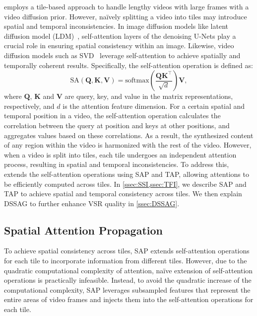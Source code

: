 \ours{} employs a tile-based approach to handle lengthy videos with large frames with a video diffusion prior.
However, na\"ively splitting a video into tiles may introduce spatial and temporal inconsistencies.
In image diffusion models like latent diffusion model (LDM)~\cite{ldm}, self-attention layers of the denoising U-Nets play a crucial role in ensuring spatial consistency within an image.
Likewise, video diffusion models such as SVD~\cite{svd} leverage self-attention to achieve spatially and temporally coherent results.
Specifically, the self-attention operation is defined as:
\begin{equation}
    \text{SA}(\bm{Q},\bm{K},\bm{V}) = \text{softmax} \left( \frac{\bm{QK}^\top}{\sqrt{d}} \right) \bm{V},
    \label{eq:self_attention}
\end{equation}
where $\bm{Q}$, $\bm{K}$ and $\bm{V}$ are query, key, and value in the matrix representations, respectively, and $d$ is the attention feature dimension.
For a certain spatial and temporal position in a video, the self-attention operation calculates the correlation between the query at position and keys at other positions, and aggregates values based on these correlations. As a result, the synthesized content of any region within the video is harmonized with the rest of the video.
However, when a video is split into tiles, each tile undergoes an independent attention process, resulting in spatial and temporal inconsistencies. To address this, \ours{} extends the self-attention operations using SAP and TAP, allowing attentions to be efficiently computed across tiles.
In \cref{ssec:SSI,ssec:TFI}, we describe SAP and TAP to achieve spatial and temporal consistency across tiles.
We then explain DSSAG to further enhance VSR quality in \cref{ssec:DSSAG}.

\subsection{Spatial Attention Propagation}
\label{ssec:SSI}
To achieve spatial consistency across tiles, SAP extends self-attention operations for each tile to incorporate information from different tiles. However, due to the quadratic computational complexity of attention, na\"ive extension of self-attention operations is practically infeasible.
Instead, to avoid the quadratic increase of the computational complexity, SAP leverages subsampled features that represent the entire areas of video frames and injects them into the self-attention operations for each tile.


